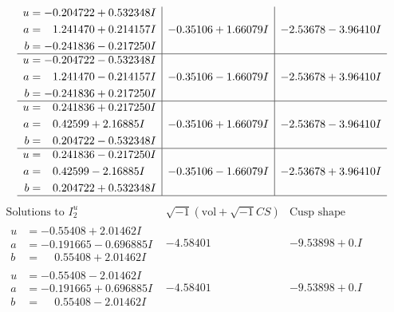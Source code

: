 \documentclass[1p]{elsarticle_modified}
\theoremstyle{definition}
\newcommand{\I}{\sqrt{-1}}
\begin{document}
$$\begin{array}{c|c|c}
\begin{aligned}
u &= -0.204722 + 0.532348 I \\
a &= \phantom{-}1.241470 + 0.214157 I \\
b &= -0.241836 - 0.217250 I\end{aligned}
 & -0.35106 + 1.66079 I & -2.53678 - 3.96410 I \\ \hline\begin{aligned}
u &= -0.204722 - 0.532348 I \\
a &= \phantom{-}1.241470 - 0.214157 I \\
b &= -0.241836 + 0.217250 I\end{aligned}
 & -0.35106 - 1.66079 I & -2.53678 + 3.96410 I \\ \hline\begin{aligned}
u &= \phantom{-}0.241836 + 0.217250 I \\
a &= \phantom{-}0.42599 + 2.16885 I \\
b &= \phantom{-}0.204722 - 0.532348 I\end{aligned}
 & -0.35106 + 1.66079 I & -2.53678 - 3.96410 I \\ \hline\begin{aligned}
u &= \phantom{-}0.241836 - 0.217250 I \\
a &= \phantom{-}0.42599 - 2.16885 I \\
b &= \phantom{-}0.204722 + 0.532348 I\end{aligned}
 & -0.35106 - 1.66079 I & -2.53678 + 3.96410 I\\
 \hline 
 \end{array}$$\newpage$$\begin{array}{c|c|c}  
\text{Solutions to }I^u_{2}& \I (\text{vol} + \sqrt{-1}CS) & \text{Cusp shape}\\
 \hline 
\begin{aligned}
u &= -0.55408 + 2.01462 I \\
a &= -0.191665 - 0.696885 I \\
b &= \phantom{-}0.55408 + 2.01462 I\end{aligned}
 & -4.58401\phantom{ +0.000000I} & -9.53898 + 0. I\phantom{ +0.000000I} \\ \hline\begin{aligned}
u &= -0.55408 - 2.01462 I \\
a &= -0.191665 + 0.696885 I \\
b &= \phantom{-}0.55408 - 2.01462 I\end{aligned}
 & -4.58401\phantom{ +0.000000I} & -9.53898 + 0. I\phantom{ +0.000000I} \\ \hline\begin{aligned}

\end{aligned}
\end{array}$$
\end{document}
